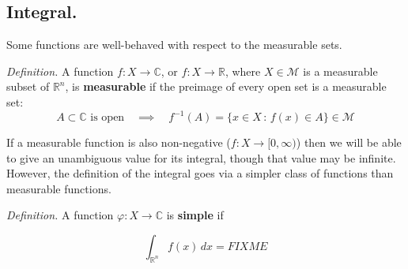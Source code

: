 \documentclass[12pt]{article}
\newcommand{\cM}{\mathcal{M}}
\newcommand{\CC}{\mathbb{C}}
\newcommand{\RR}{\mathbb{R}}
\newcommand{\sect}[1]{\subsection*{#1.}}
\newcommand{\defin}{\emph{Definition.}\,\,}
\begin{document}
\sect{Integral}

Some functions are well-behaved with respect to the measurable sets.

\defin A function $f:X\to\CC$, or $f:X\to \RR$, where $X \in \cM$ is a measurable subset of $\RR^n$, is \textbf{measurable} if the preimage of every open set is a measurable set:
	$$A \subset \CC \text{ is open} \quad \implies \quad f^{-1}(A)=\{x\in X\,:\,f(x)\in A\} \in \cM$$

If a measurable function is also non-negative ($f:X\to [0,\infty)$) then we will be able to give an unambiguous value for its integral, though that value may be infinite.  However, the definition of the integral goes via a simpler class of functions than measurable functions.

\defin A function $\varphi:X\to \CC$ is \textbf{simple} if 

    $$\int_{\RR^n} f(x)\,dx = FIXME$$
\end{document}

